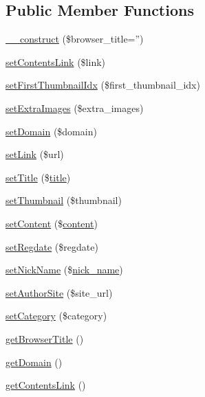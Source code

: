 \subsection*{Public Member Functions}
\begin{DoxyCompactItemize}
\item 
\hyperlink{classcontentItem_a6a6a90d6966375df1ea7dec5a82d18a7}{\-\_\-\-\_\-construct} (\$browser\-\_\-title='')
\item 
\hyperlink{classcontentItem_afe78ae4ab14d74305c86d27570d9a7f8}{set\-Contents\-Link} (\$link)
\item 
\hyperlink{classcontentItem_ab18307a6068a6cdde94369976fe730f4}{set\-First\-Thumbnail\-Idx} (\$first\-\_\-thumbnail\-\_\-idx)
\item 
\hyperlink{classcontentItem_a8f635dff719c18bf5e969b13ca901c74}{set\-Extra\-Images} (\$extra\-\_\-images)
\item 
\hyperlink{classcontentItem_a61b6be878a0183cd1c3dfde8f29d5c20}{set\-Domain} (\$domain)
\item 
\hyperlink{classcontentItem_aad5f15eead8728ad5e2636740c4ff145}{set\-Link} (\$url)
\item 
\hyperlink{classcontentItem_a5a29426d7878c413cd6d63e930ce0a0f}{set\-Title} (\$\hyperlink{ko_8install_8php_a5b072c5fd1d2228c6ba5cee13cd142e3}{title})
\item 
\hyperlink{classcontentItem_a0145a758535658fa776871bfd675be15}{set\-Thumbnail} (\$thumbnail)
\item 
\hyperlink{classcontentItem_ad7355ad724398f4fbc79832241767405}{set\-Content} (\$\hyperlink{classcontent}{content})
\item 
\hyperlink{classcontentItem_abb2dad632dd405213708d5c211518c82}{set\-Regdate} (\$regdate)
\item 
\hyperlink{classcontentItem_ae3175aa0291e75bf95cb1220e50a33e4}{set\-Nick\-Name} (\$\hyperlink{ko_8install_8php_a151ecae87a1f3d7e257aa089803086bd}{nick\-\_\-name})
\item 
\hyperlink{classcontentItem_af28f4f40f1ac95cee2d88fe1e7d4b683}{set\-Author\-Site} (\$site\-\_\-url)
\item 
\hyperlink{classcontentItem_aa8ba578ae6629d632a42a76da823c59f}{set\-Category} (\$category)
\item 
\hyperlink{classcontentItem_a1590559deb019ba22a637cf78408f242}{get\-Browser\-Title} ()
\item 
\hyperlink{classcontentItem_a7a513d119938877566418029c6124a45}{get\-Domain} ()
\item 
\hyperlink{classcontentItem_a80a161de842f1a890fdbfee439674881}{get\-Contents\-Link} ()

\end{DoxyCompactItemize}
